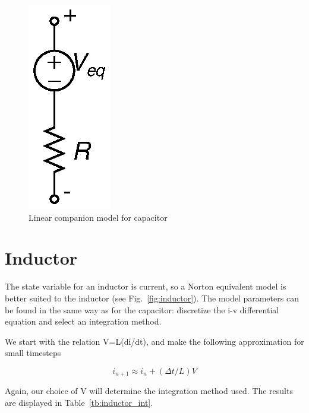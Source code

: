 \documentclass{article}
\begin{document}
\begin{figure}[h]
\begin{center}
\includegraphics{../fig/cap.eps}
\caption{Linear companion model for capacitor \label{fig:cap}}
\end{center}
\end{figure}

\pagebreak

\section{Inductor}

The state variable for an inductor is current, so a Norton equivalent model is better suited to the inductor (see Fig.~\ref{fig:inductor}).  The model parameters can be found in the same way as for the capacitor: discretize the i-v differential equation and select an integration method.

We start with the relation V=L(di/dt), and make the following approximation for small timesteps

\begin{equation}
i_{n+1} \approx i_n + (\Delta t/L)V
\end{equation}

Again, our choice of V will determine the integration method used.  The results are displayed in Table~\ref{tb:inductor_int}.
\end{document}
